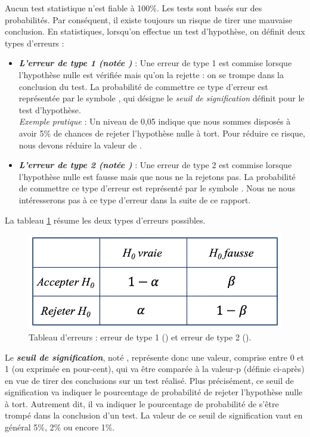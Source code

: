 \documentclass[10pt, oneside, a4paper]{article}
\begin{document}
Aucun test statistique n'est fiable à 100\%. Les tests sont basés sur des probabilités. Par conséquent, il existe toujours un risque de tirer une mauvaise conclusion. En statistiques, lorsqu'on effectue un test d'hypothèse, on définit deux types d'erreurs : 
\begin{itemize}
\item \textbf{\textit{L'erreur de type 1 (notée \alpha)}} : Une erreur de type 1 est commise lorsque l'hypothèse nulle est vérifiée mais qu'on la rejette : on se trompe dans la conclusion du test. La probabilité de commettre ce type d'erreur est représentée par le symbole \alpha, qui désigne le \textit{seuil de signification} définit pour le test d'hypothèse. \\ 
\textit{Exemple pratique} : Un niveau {\alpha} de 0,05 indique que nous sommes disposés à avoir 5\% de chances de rejeter l'hypothèse nulle à tort. Pour réduire ce risque, nous devons réduire la valeur de \alpha.
\item \textbf{\textit{L'erreur de type 2 (notée \beta)}} : Une erreur de type 2 est commise lorsque l'hypothèse nulle est fausse mais que nous ne la rejetons pas. La probabilité de commettre ce type d'erreur est représenté par le symbole \beta. Nous ne nous intéresserons pas à ce type d'erreur dans la suite de ce rapport. \\
\end{itemize}
La tableau \ref{tab:erreurs} résume les deux types d'erreurs possibles.
\begin{figure}[htbp]
    \centering
    \includegraphics[scale=0.4]{image/erreur}    
    \caption{Tableau d'erreurs : erreur de type 1 (\alpha) et erreur de type 2 (\beta).}    
    \label{tab:erreurs}
\end{figure}

Le \textbf{\textit{seuil de signification}}, noté \alpha, représente donc une valeur, comprise entre 0 et 1 (ou exprimée en pour-cent), qui va être comparée à la valeur-p (définie ci-après) en vue de tirer des conclusions sur un test réalisé. Plus précisément, ce seuil de signification va indiquer le pourcentage de probabilité de rejeter l'hypothèse nulle à tort. Autrement dit, il va indiquer le pourcentage de probabilité de s'être trompé dans la conclusion d'un test. La valeur de ce seuil de signification vaut en général 5\%, 2\% ou encore 1\%.
\end{document}
